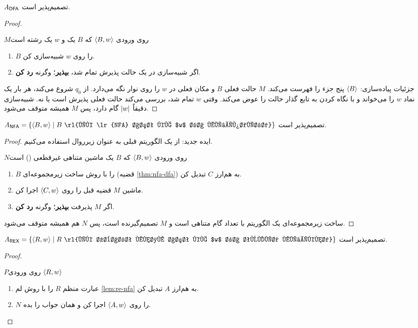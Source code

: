 \begin{theorem}
$\mathit{A}_{\mathsf{DFA}}$ تصمیم‌پذیر است.
\end{theorem}
\begin{proof}
\begin{algo}{$M$}{روی ورودی $\langle B,w\rangle$ که $B$ یک  و $w$ یک رشته است}
\begin{enumerate}
\item $B$ را روی $w$ شبیه‌سازی کن.
\item اگر شبیه‌سازی در یک حالت پذیرش تمام شد، \textbf{بپذیر}؛ وگرنه \textbf{رد کن}.
\end{enumerate}
\end{algo}
جزئیات پیاده‌سازی: $\langle B\rangle$ پنج جزء  را فهرست می‌کند. $M$ حالت فعلی $B$ و مکان فعلی در $w$ را روی نوار نگه می‌دارد. از $q_0$ شروع می‌کند، هر بار یک نماد $w$ را می‌خواند و با نگاه کردن به تابع گذار حالت را عوض می‌کند. وقتی $w$ تمام شد، بررسی می‌کند حالت فعلی پذیرش است یا نه. شبیه‌سازی دقیقاً $\lvert w\rvert$ گام دارد، پس $M$ همیشه متوقف می‌شود.
\end{proof}

\begin{theorem}
$\lng{A}{NFA}=\{\enc{B,w}\st B\ \text{\rl{یک \lr{NFA} است که $w$ را می‌پذیرد}}\}$ تصمیم‌پذیر است.
\end{theorem}
\begin{proof}
ایده جدید: از یک الگوریتم قبلی به عنوان زیرروال استفاده می‌کنیم.
\begin{algo}{$N$}{روی ورودی $\langle B,w\rangle$ که $B$ یک ماشین متناهی غیرقطعی () است}
\begin{enumerate}
\item $B$ را با روش ساخت زیرمجموعه‌ای (قضیه \ref{thm:nfa-dfa}) به  هم‌ارز $C$ تبدیل کن.
\item ماشین $M$ قضیه قبل را روی $\langle C,w\rangle$ اجرا کن.
\item اگر $M$ پذیرفت \textbf{بپذیر}؛ وگرنه \textbf{رد کن}.
\end{enumerate}
\end{algo}
ساخت زیرمجموعه‌ای یک الگوریتم با تعداد گام متناهی است و $M$ تصمیم‌گیرنده است، پس $N$ هم همیشه متوقف می‌شود.
\end{proof}

\begin{theorem}
$\lng{A}{REX}=\{\enc{R,w}\st R\ \text{\rl{یک عبارت منظم است که $w$ را تولید می‌کند}}\}$ تصمیم‌پذیر است.
\end{theorem}
\begin{proof}
\begin{algo}{$P$}{روی ورودی $\langle R,w\rangle$}
\begin{enumerate}
\item عبارت منظم $R$ را با روش لم \ref{lem:re-nfa} به  هم‌ارز $A$ تبدیل کن.
\item $N$ را روی $\langle A,w\rangle$ اجرا کن و همان جواب را بده.\qedhere
\end{enumerate}
\end{algo}
\end{proof}

